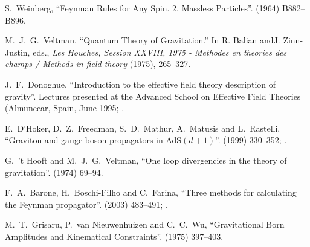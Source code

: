 \begin{thebibliography}{99}
S.~Weinberg,
``Feynman Rules for Any Spin. 2. Massless Particles''.
  (1964) B882--B896.\newline
{\tt{}}

M.~J.~G.~Veltman,
``Quantum Theory of Gravitation.''
In R. Balian andJ. Zinn-Justin, eds.,
\emph{Les Houches, Session XXVIII, 1975 - Methodes en theories des champs / Methods in field theory}
(1975), 265--327.

J.~F.~Donoghue,
``Introduction to the effective field theory description of gravity''.
Lectures presented at the Advanced School on Effective Field Theories
(Almunecar, Spain, June 1995; .

E.~D'Hoker, D.~Z.~Freedman, S.~D.~Mathur, A.~Matusis and L.~Rastelli,
``Graviton and gauge boson propagators in AdS$(d+1)$''.
  (1999) 330--352;
.\newline
{\tt{}}

G.~'t Hooft and M.~J.~G.~Veltman,
``One loop divergencies in the theory of gravitation''.
  (1974) 69--94.

F.~A.~Barone, H.~Boschi-Filho and C.~Farina,
``Three methods for calculating the Feynman propagator''.
  (2003) 483--491; .\newline
{\tt{}}

M.~T.~Grisaru, P.~van Nieuwenhuizen and C.~C.~Wu,
``Gravitational Born Amplitudes and Kinematical Constraints''.
  (1975) 397--403.\newline
{\tt{}}

\end{thebibliography}
